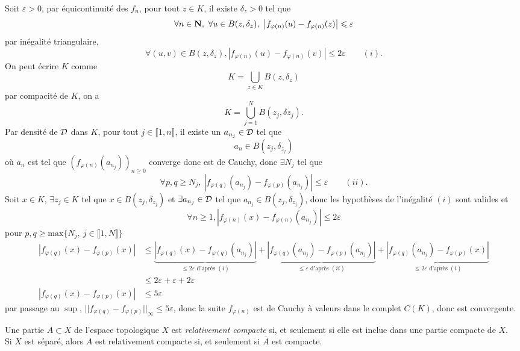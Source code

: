 \documentclass[a4paper,11pt, twoside]{article}
\begin{document}
\begin{Proof}
  Soit $\varepsilon>0$, par équicontinuité des $f_n$, pour tout $z\in K$, il existe $\delta_z>0$ tel que 
  $$\forall n\in \N,\ \forall u\in B(z,\delta_z),\ \left|f_{\varphi(n)}(u)-f_{\varphi(n)}(z)\right|\leqslant \varepsilon$$
  par inégalité triangulaire,
  $$\forall (u,v)\in B(z,\delta_z), \left|f_{\varphi(n)}(u)-f_{\varphi(n)}(v)\right|\leqslant 2\varepsilon\qquad (i).$$
  On peut écrire $K$ comme 
  $$K=\bigcup_{z\in K}B(z,\delta_z)$$
  par compacité de $K$, on a 
  $$K=\bigcup_{j=1}^NB(z_j,\delta{z_j}).$$
  Par densité de $\mathcal D$ dans $K$, pour tout $j\in\llbracket 1,n\rrbracket$, il existe un $a_{n_j}\in\mathcal D$ tel que 
  $$a_n\in B(z_j,\delta_{z_j})$$
  où $a_n$ est tel que $\left(f_{\varphi(n)}(a_{n_j})\right)_{n\geqslant 0}$ converge donc est de Cauchy, donc $\exists N_j$ tel que 
  $$\forall p,q\geqslant N_j,\ \left|f_{\varphi(q)}(a_{n_j})-f_{\varphi(p)}(a_{n_j})\right|\leqslant\varepsilon\qquad (ii).$$
  Soit $x\in K$, $\exists z_j\in K$ tel que $x\in B(z_j,\delta_{z_j})$ et $\exists a_{n_j}\in\mathcal D$ tel que $a_{n_j}\in B(z_j,\delta_{z_j})$, donc les hypothèses de l'inégalité $(i)$ sont valides et
  $$\forall n\geqslant 1, \left|f_{\varphi(n)}(x)-f_{\varphi(n)}(a_{n_j})\right|\leqslant 2\varepsilon$$
  pour $p,q\geqslant\mathrm{max}\{N_j,\ j\in\llbracket 1,N\rrbracket\}$
  \begin{align*}
    \left|f_{\varphi(q)}(x)-f_{\varphi(p)}(x)\right|&\leqslant \underbrace{\left|f_{\varphi(q)}(x)-f_{\varphi(q)}(a_{n_j})\right|}_{\leqslant 2\varepsilon\text{ d'après }(i)}+\underbrace{\left|f_{\varphi(q)}(a_{n_j})-f_{\varphi(p)}(a_{n_j})\right|}_{\leqslant \varepsilon\text{ d'après }(ii)}+\underbrace{\left|f_{\varphi(q)}(a_{n_j})-f_{\varphi(p)}(x)\right|}_{\leqslant 2\varepsilon\text{ d'après }(i)}\\
    &\leqslant 2\varepsilon+\varepsilon+2\varepsilon\\
    \left|f_{\varphi(q)}(x)-f_{\varphi(p)}(x)\right|&\leqslant 5\varepsilon
  \end{align*}
  par passage au $\mathrm{\sup}$, $||f_{\varphi(q)}-f_{\varphi(p)}||_\infty\leqslant 5\varepsilon$, donc la suite $f_{\varphi(n)}$ est de Cauchy à valeurs dans le complet $C(K)$, donc est convergente.
\end{Proof}

\begin{Def}
  Une partie $A\subset X$ de l'espace topologique $X$ est \emph{relativement compacte} si, et seulement si elle est inclue dans une partie compacte de $X$.\\

  Si $X$ est séparé, alors $A$ est relativement compacte si, et seulement si $\overline A$ est compacte.
\end{Def}
\end{document}
